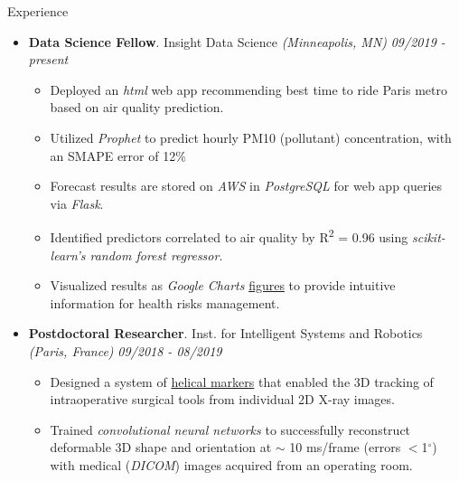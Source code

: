 \documentclass{resume} %
\begin{document}
	
	
	
	
	\begin{rSection}{Experience}
		
		\begin{itemize}[leftmargin=0em]
			\item {\bf Data Science Fellow}{. Insight Data Science \textit{(Minneapolis, MN)}} \hfill {\em 09/2019 - present}\\
			\vspace{-5mm}
			\begin{itemize}
				\setlength\itemsep{-1.75em}
				\item Deployed an \textit{html} web app recommending best time to ride Paris metro based on air quality prediction.\\
				\item Utilized \textit{Prophet} to predict hourly PM10 (pollutant) concentration, with an SMAPE error of 12\% \\
				\item Forecast results are stored on \textit{AWS} in \textit{PostgreSQL} for web app queries via \textit{Flask}.\\
				\item Identified predictors correlated to air quality by R\textsuperscript{2} = 0.96 using \textit{scikit-learn's random forest regressor}.\\
				\item Visualized results as \textit{Google Charts} \href{https://tinyurl.com/yxptcaz7
				}{figures} to provide intuitive information for health risks management.
			\end{itemize}	
			
			\item {\bf Postdoctoral Researcher}{. Inst. for Intelligent Systems and Robotics \textit{(Paris, France)}} \hfill {\em 09/2018 - 08/2019}\\
			\vspace{-5mm}
			\begin{itemize}
				\setlength\itemsep{-1.75em}
				\item  Designed a system of \href{https://tinyurl.com/yxk4jou4}{helical markers} that enabled the 3D tracking of intraoperative surgical tools from individual 2D X-ray images.\\ 
				\item  Trained \textit{convolutional neural networks} to successfully reconstruct deformable 3D shape and orientation at $\sim$ 10 ms/frame (errors $<$1$^\circ$) with medical (\textit{DICOM}) images acquired from an operating room.
			\end{itemize}
			

\end{itemize}
\end{rSection}
\end{document}
